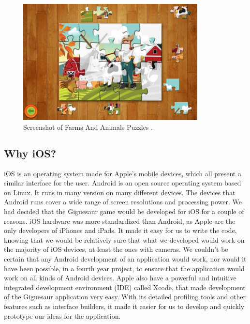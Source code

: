 \documentclass{article}
\begin{document}
\begin{figure}[ht]
\begin{center}
\includegraphics[width=0.85\textwidth]{images/FarmAnimalsJigsawImage}
\caption{Screenshot of Farms And Animals Puzzles \cite{img:FarmPuzzle}.}
\label{fig:FarmsAnimals}
\end{center}
\end{figure}

\subsection{Why iOS?}
iOS is an operating system made for Apple's mobile devices, which all present a
similar interface for the user. Android is an open source operating system based
on Linux. It runs in many version on many different devices. The devices that
Android runs cover a wide range of screen resolutions and processing power. We
had decided that the Giguesaur game would be developed for iOS for a couple of
reasons. iOS hardware was more standardized than Android, as Apple are the only
developers of iPhones and iPads. It made it easy for us to write the code,
knowing that we would be relatively sure that what we developed would work on
the majority of iOS devices, at least the ones with cameras. We couldn't be
certain that any Android development of an application would work, nor would it
have been possible, in a fourth year project, to ensure that the application would
work on all kinds of Android devices. Apple also have a powerful and
intuitive integrated development environment (IDE) called Xcode, that made
development of the Giguesaur application very easy. With its detailed profiling
tools and other features such as interface builders, it made it easier for us to
develop and quickly prototype our ideas for the application.
\end{document}
